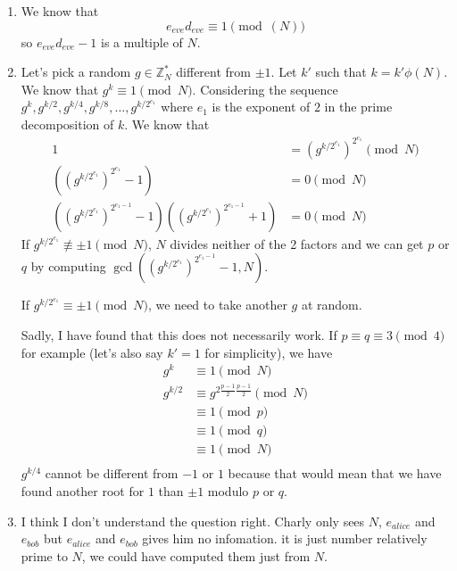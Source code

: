 \begin{solution}
  \begin{enumerate}
    \item
      We know that
      \[ e_{eve}d_{eve} \equiv 1 \pmod(N) \]
      so $e_{eve}d_{eve}-1$ is a multiple of $N$.
    \item
      Let's pick a random $g \in \mathbb{Z}_N^*$ different from $\pm 1$.
      Let $k'$ such that $k = k'\phi(N)$.
      We know that $g^k \equiv 1 \pmod{N}$.
      Considering the sequence
      $g^k, g^{k/2}, g^{k/4}, g^{k/8}, \ldots, g^{k/2^{e_1}}$
      where $e_1$ is the exponent of $2$ in the prime decomposition of $k$.
      We know that
      \begin{align*}
        1
        & = (g^{k/2^{e_1}})^{2^{e_1}} \pmod{N}\\
        ((g^{k/2^{e_1}})^{2^{e_1}} - 1) & = 0 \pmod{N}\\
        ((g^{k/2^{e_1}})^{2^{e_1-1}} - 1)((g^{k/2^{e_1}})^{2^{e_1-1}} + 1) & = 0 \pmod{N}
      \end{align*}
      If $g^{k/2^{e_1}} \not\equiv \pm 1 \pmod{N}$,
      $N$ divides neither of the 2 factors and we can get $p$ or $q$
      by computing $\gcd((g^{k/2^{e_1}})^{2^{e_1-1}} - 1, N)$.

      If $g^{k/2^{e_1}} \equiv \pm 1 \pmod{N}$,
      we need to take another $g$ at random.

      Sadly, I have found that this does not necessarily work.
      If $p \equiv q \equiv 3 \pmod{4}$ for example (let's also say $k' = 1$ for simplicity),
      we have
      \begin{align*}
        g^{k} & \equiv 1 \pmod{N}\\
        g^{k/2}
        & \equiv g^{2\frac{p-1}{2}\frac{p-1}{2}} \pmod{N}\\
        & \equiv 1 \pmod{p}\\
        & \equiv 1 \pmod{q}\\
        & \equiv 1 \pmod{N}\\
      \end{align*}
      $g^{k/4}$ cannot be different from $-1$ or $1$ because that would mean that
      we have found another root for $1$ than $\pm 1$ modulo $p$ or $q$.
    \item
      I think I don't understand the question right.
      Charly only sees $N$, $e_{alice}$ and $e_{bob}$
      but $e_{alice}$ and $e_{bob}$ gives him no infomation.
      it is just number relatively prime to $N$,
      we could have computed them just from $N$.
  \end{enumerate}
\end{solution}
